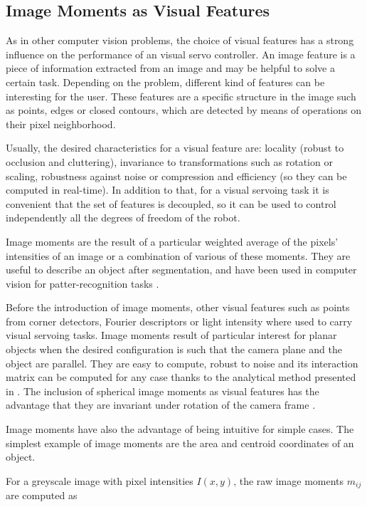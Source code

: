 \subsection{Image Moments as Visual Features}
\label{sec:image-moments}

As in other computer vision problems, the choice of visual features has a strong influence on the performance of an visual servo controller. An image feature is a piece of information extracted from an image and may be helpful to solve a certain task. Depending on the problem, different kind of features can be interesting for the user. These features are a specific structure in the image such as points, edges or closed contours, which are detected by means of operations on their pixel neighborhood.

Usually, the desired characteristics \cite{Szeliski2011} for a visual feature are: locality (robust to occlusion and cluttering), invariance to transformations such as rotation or scaling, robustness against noise or compression and efficiency (so they can be computed in real-time). In addition to that, for a visual servoing task it is convenient that the set of features is decoupled, so it can be used to control independently all the degrees of freedom of the robot.

Image moments are the result of a particular weighted average of the pixels' intensities of an image or a combination of various of these moments. They are useful to describe an object after segmentation, and have been used in computer vision for patter-recognition tasks \cite{hu_1962}.

Before the introduction of image moments, other visual features such as points from corner detectors, Fourier descriptors or light intensity where used to carry visual servoing tasks. Image moments result of particular interest for planar objects when the desired configuration is such that the camera plane and the object are parallel. They are easy to compute, robust to noise and its interaction matrix can be computed for any case thanks to the analytical method presented in \cite{chaumette_image_2004}. The inclusion of spherical image moments as visual features has the advantage that they are invariant under rotation of the camera frame \cite{bourquardez_stability_2006}. 

Image moments have also the advantage of being intuitive for simple cases. The simplest example of image moments are the area and centroid coordinates of an object.

For a greyscale image with pixel intensities $I(x, y)$, the raw image moments $m_{ij}$ are computed as

